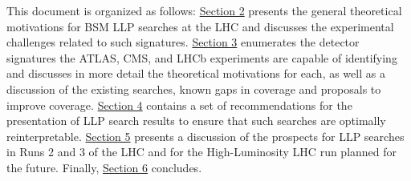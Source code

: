 This document is organized as follows: \hyperref[sec:motivation]{Section 2} presents the general theoretical motivations for BSM LLP searches at the LHC and discusses the experimental challenges related to such signatures.  \hyperref[sec:signatures]{Section 3} enumerates the detector signatures the ATLAS, CMS, and LHCb experiments are capable of identifying and discusses in more detail the theoretical motivations for each, as well as a discussion of the existing searches, known gaps in coverage and proposals to improve coverage.  \hyperref[sec:recommendations]{Section 4} contains a set of recommendations for the presentation of LLP search results to ensure that such searches are optimally reinterpretable.  \hyperref[sec:future]{Section 5} presents a discussion of the prospects for LLP searches in Runs 2 and 3 of the LHC and for the High-Luminosity LHC run planned for the future.  Finally, \hyperref[sec:conclusions]{Section 6} concludes.




